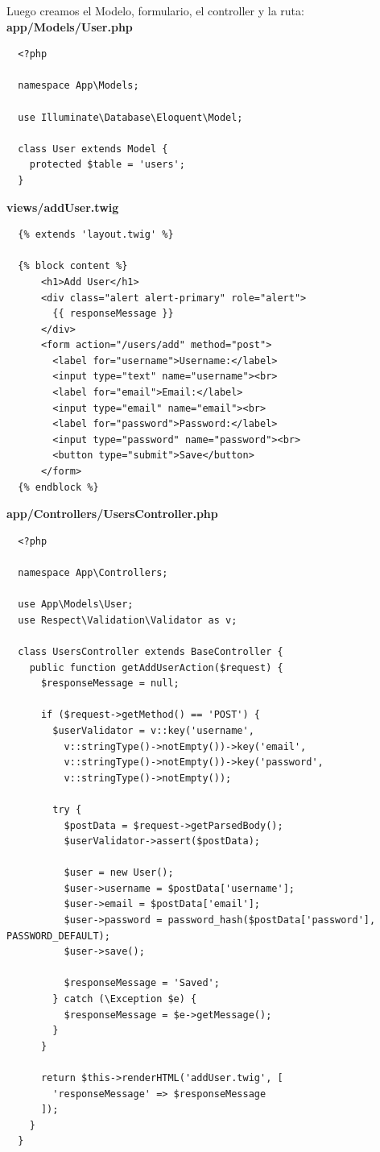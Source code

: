 \documentclass{article}
\begin{document}
Luego creamos el Modelo, formulario, el controller y la ruta:\\

\textbf{app/Models/User.php}
\begin{verbatim}
  <?php

  namespace App\Models;

  use Illuminate\Database\Eloquent\Model;

  class User extends Model {
    protected $table = 'users';
  }
\end{verbatim}

\textbf{views/addUser.twig}
\begin{verbatim}
  {% extends 'layout.twig' %}

  {% block content %}
      <h1>Add User</h1>
      <div class="alert alert-primary" role="alert">
        {{ responseMessage }}
      </div>
      <form action="/users/add" method="post">
        <label for="username">Username:</label>
        <input type="text" name="username"><br>
        <label for="email">Email:</label>
        <input type="email" name="email"><br>
        <label for="password">Password:</label>
        <input type="password" name="password"><br>
        <button type="submit">Save</button>
      </form>
  {% endblock %}
\end{verbatim}

\newpage

\textbf{app/Controllers/UsersController.php}
\begin{verbatim}
  <?php

  namespace App\Controllers;

  use App\Models\User;
  use Respect\Validation\Validator as v;

  class UsersController extends BaseController {
    public function getAddUserAction($request) {
      $responseMessage = null;

      if ($request->getMethod() == 'POST') {
        $userValidator = v::key('username',
          v::stringType()->notEmpty())->key('email',
          v::stringType()->notEmpty())->key('password',
          v::stringType()->notEmpty());

        try {
          $postData = $request->getParsedBody();
          $userValidator->assert($postData);

          $user = new User();
          $user->username = $postData['username'];
          $user->email = $postData['email'];
          $user->password = password_hash($postData['password'], PASSWORD_DEFAULT);
          $user->save();

          $responseMessage = 'Saved';
        } catch (\Exception $e) {
          $responseMessage = $e->getMessage();
        }
      }

      return $this->renderHTML('addUser.twig', [
        'responseMessage' => $responseMessage
      ]);
    }
  }
\end{verbatim}
\end{document}
